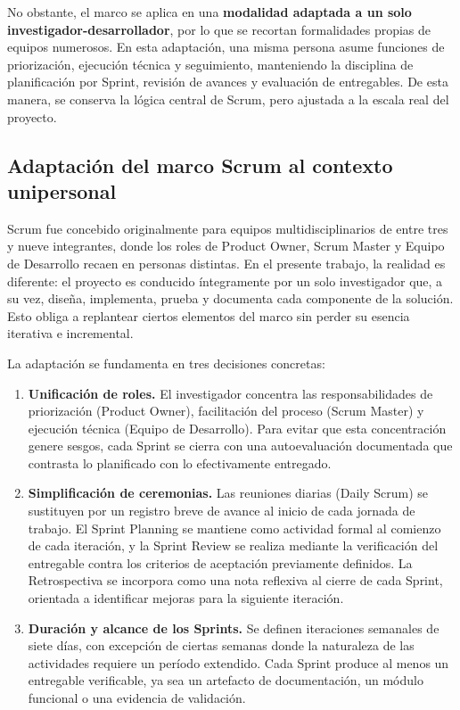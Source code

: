 No obstante, el marco se aplica en una \textbf{modalidad adaptada a un solo investigador-desarrollador}, por lo que se recortan formalidades propias de equipos numerosos. En esta adaptación, una misma persona asume funciones de priorización, ejecución técnica y seguimiento, manteniendo la disciplina de planificación por Sprint, revisión de avances y evaluación de entregables. De esta manera, se conserva la lógica central de Scrum, pero ajustada a la escala real del proyecto.

\subsection{Adaptación del marco Scrum al contexto unipersonal}

Scrum fue concebido originalmente para equipos multidisciplinarios de entre tres y nueve integrantes, donde los roles de Product Owner, Scrum Master y Equipo de Desarrollo recaen en personas distintas. En el presente trabajo, la realidad es diferente: el proyecto es conducido íntegramente por un solo investigador que, a su vez, diseña, implementa, prueba y documenta cada componente de la solución. Esto obliga a replantear ciertos elementos del marco sin perder su esencia iterativa e incremental.

La adaptación se fundamenta en tres decisiones concretas:

\begin{enumerate}
    \item \textbf{Unificación de roles.} El investigador concentra las responsabilidades de priorización (Product Owner), facilitación del proceso (Scrum Master) y ejecución técnica (Equipo de Desarrollo). Para evitar que esta concentración genere sesgos, cada Sprint se cierra con una autoevaluación documentada que contrasta lo planificado con lo efectivamente entregado.

    \item \textbf{Simplificación de ceremonias.} Las reuniones diarias (Daily Scrum) se sustituyen por un registro breve de avance al inicio de cada jornada de trabajo. El Sprint Planning se mantiene como actividad formal al comienzo de cada iteración, y la Sprint Review se realiza mediante la verificación del entregable contra los criterios de aceptación previamente definidos. La Retrospectiva se incorpora como una nota reflexiva al cierre de cada Sprint, orientada a identificar mejoras para la siguiente iteración.

    \item \textbf{Duración y alcance de los Sprints.} Se definen iteraciones semanales de siete días, con excepción de ciertas semanas donde la naturaleza de las actividades requiere un período extendido. Cada Sprint produce al menos un entregable verificable, ya sea un artefacto de documentación, un módulo funcional o una evidencia de validación.
\end{enumerate}

